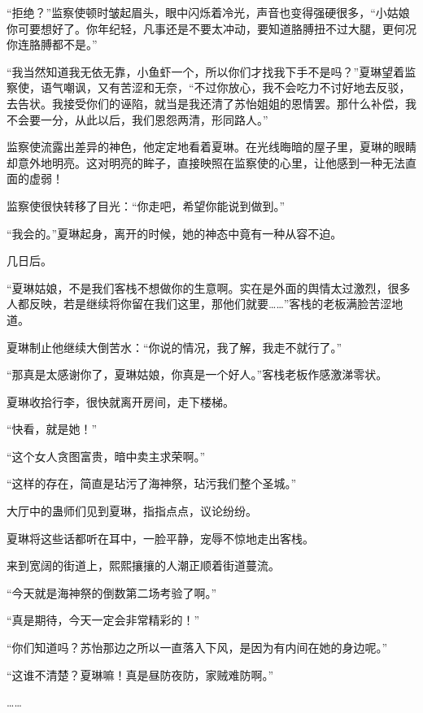 
\begin{this_body}



“拒绝？”监察使顿时皱起眉头，眼中闪烁着冷光，声音也变得强硬很多，“小姑娘你可要想好了。你年纪轻，凡事还是不要太冲动，要知道胳膊扭不过大腿，更何况你连胳膊都不是。”

“我当然知道我无依无靠，小鱼虾一个，所以你们才找我下手不是吗？”夏琳望着监察使，语气嘲讽，又有苦涩和无奈，“不过你放心，我不会吃力不讨好地去反驳，去告状。我接受你们的诬陷，就当是我还清了苏怡姐姐的恩情罢。那什么补偿，我不会要一分，从此以后，我们恩怨两清，形同路人。”

监察使流露出差异的神色，他定定地看着夏琳。在光线晦暗的屋子里，夏琳的眼睛却意外地明亮。这对明亮的眸子，直接映照在监察使的心里，让他感到一种无法直面的虚弱！

监察使很快转移了目光：“你走吧，希望你能说到做到。”

“我会的。”夏琳起身，离开的时候，她的神态中竟有一种从容不迫。

几日后。

“夏琳姑娘，不是我们客栈不想做你的生意啊。实在是外面的舆情太过激烈，很多人都反映，若是继续将你留在我们这里，那他们就要……”客栈的老板满脸苦涩地道。

夏琳制止他继续大倒苦水：“你说的情况，我了解，我走不就行了。”

“那真是太感谢你了，夏琳姑娘，你真是一个好人。”客栈老板作感激涕零状。

夏琳收拾行李，很快就离开房间，走下楼梯。

“快看，就是她！”

“这个女人贪图富贵，暗中卖主求荣啊。”

“这样的存在，简直是玷污了海神祭，玷污我们整个圣城。”

大厅中的蛊师们见到夏琳，指指点点，议论纷纷。

夏琳将这些话都听在耳中，一脸平静，宠辱不惊地走出客栈。

来到宽阔的街道上，熙熙攘攘的人潮正顺着街道蔓流。

“今天就是海神祭的倒数第二场考验了啊。”

“真是期待，今天一定会非常精彩的！”

“你们知道吗？苏怡那边之所以一直落入下风，是因为有内间在她的身边呢。”

“这谁不清楚？夏琳嘛！真是昼防夜防，家贼难防啊。”

……


\end{this_body}
